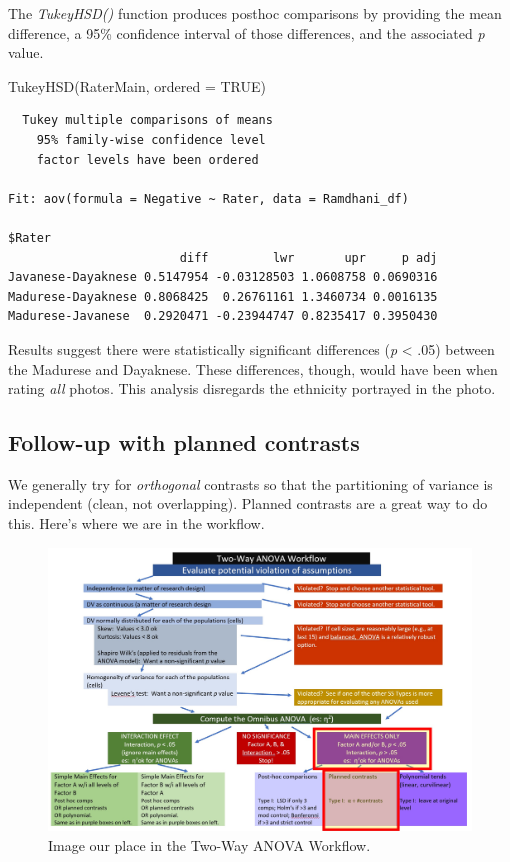 \documentclass[
  11pt,
]{book}
\newenvironment{Shaded}{\begin{snugshade}}{\end{snugshade}}
\newcommand{\AttributeTok}[1]{\textcolor[rgb]{0.77,0.63,0.00}{#1}}
\newcommand{\ConstantTok}[1]{\textcolor[rgb]{0.00,0.00,0.00}{#1}}
\newcommand{\FunctionTok}[1]{\textcolor[rgb]{0.00,0.00,0.00}{#1}}
\newcommand{\NormalTok}[1]{#1}
\begin{document}
The \emph{TukeyHSD()} function produces posthoc comparisons by providing the mean difference, a 95\% confidence interval of those differences, and the associated \emph{p} value.

\begin{Shaded}
\begin{Highlighting}[]
\FunctionTok{TukeyHSD}\NormalTok{(RaterMain, }\AttributeTok{ordered =} \ConstantTok{TRUE}\NormalTok{)}
\end{Highlighting}
\end{Shaded}

\begin{verbatim}
  Tukey multiple comparisons of means
    95% family-wise confidence level
    factor levels have been ordered

Fit: aov(formula = Negative ~ Rater, data = Ramdhani_df)

$Rater
                        diff         lwr       upr     p adj
Javanese-Dayaknese 0.5147954 -0.03128503 1.0608758 0.0690316
Madurese-Dayaknese 0.8068425  0.26761161 1.3460734 0.0016135
Madurese-Javanese  0.2920471 -0.23944747 0.8235417 0.3950430
\end{verbatim}

Results suggest there were statistically significant differences (\emph{p} \textless{} .05) between the Madurese and Dayaknese. These differences, though, would have been when rating \emph{all} photos. This analysis disregards the ethnicity portrayed in the photo.

\hypertarget{follow-up-with-planned-contrasts}{%
\subsection{Follow-up with planned contrasts}\label{follow-up-with-planned-contrasts}}

We generally try for \emph{orthogonal} contrasts so that the partitioning of variance is independent (clean, not overlapping). Planned contrasts are a great way to do this. Here's where we are in the workflow.

\begin{figure}
\centering
\includegraphics{images/factorial/wfMain_Plnd.jpg}
\caption{Image our place in the Two-Way ANOVA Workflow.}
\end{figure}
\end{document}
